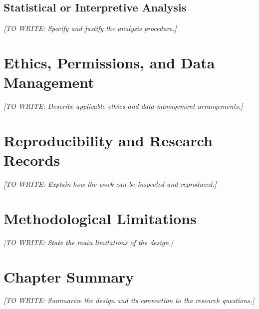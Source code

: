 \documentclass[12pt,a4paper,oneside]{report}
\newif\ifshowguidance
\newcommand{\Guide}[1]{%
  \ifshowguidance
  \begin{tcolorbox}[enhanced,breakable,colback=GuideBlue,
    colframe=GuideBorder,boxrule=0.5pt,arc=1mm,
    title={Writing guide --- replace with your research},
    colbacktitle=ThesisBlue,coltitle=white,fonttitle=\small\bfseries,
    before skip=10pt,after skip=10pt]
    \small #1
  \end{tcolorbox}
  \fi}
\newcommand{\Draft}[1]{\par\noindent\textit{[TO WRITE: #1]}\par}
\begin{document}
\subsection{Statistical or Interpretive Analysis}
\Guide{For quantitative analysis, describe estimands, models/tests,
assumptions, uncertainty intervals, effect sizes, repeated observations,
and multiplicity handling as appropriate. Distinguish exploratory analyses.
For qualitative work, describe interpretation, coding, reflexivity, evidence
selection, and disagreement resolution; use reliability statistics only
when consistent with the chosen methodology.}
\Draft{Specify and justify the analysis procedure.}

\section{Ethics, Permissions, and Data Management}
\Guide{Report approvals, consent, confidentiality, security, licensing,
conflicts of interest, and data retention when relevant. Include approval
identifiers only if obtained. If formal review is not applicable, give a
brief accurate explanation under your institution's rules. Describe access
restrictions instead of promising to share data you cannot release.}
\Draft{Describe applicable ethics and data-management arrangements.}

\section{Reproducibility and Research Records}
\Guide{Identify the code version, environment, configurations, data versions,
seeds, run records, and instructions needed to repeat the study. State which
materials are available, where, and under what restrictions. Include stable
repository or archive identifiers only when real.}
\Draft{Explain how the work can be inspected and reproduced.}

\section{Methodological Limitations}
\Guide{Identify design constraints, possible biases, measurement weaknesses,
and assumptions that affect inference. Explain mitigations and residual
effects. Save the implications of observed limitations for the discussion.}
\Draft{State the main limitations of the design.}

\section{Chapter Summary}
\Draft{Summarize the design and its connection to the research questions.}
\end{document}
